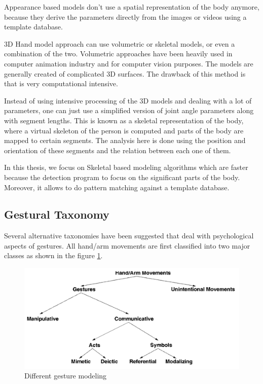 Appearance based models don't use a spatial representation of the body anymore, because they derive the parameters directly from the images or videos using a template database. 

3D Hand model approach can use volumetric or skeletal models, or even a combination of the two. Volumetric approaches have been heavily used in computer animation industry and for computer vision purposes. The models are generally created of complicated 3D surfaces. The drawback of this method is that is very computational intensive. 

Instead of using intensive processing of the 3D models and dealing with a lot of parameters, one can just use a simplified version of joint angle parameters along with segment lengths. This is known as a skeletal representation of the body, where a virtual skeleton of the person is computed and parts of the body are mapped to certain segments. The analysis here is done using the position and orientation of these segments and the relation between each one of them.

In this thesis, we focus on Skeletal based modeling algorithms which are faster because the detection program to focus on the significant parts of the body. Moreover, it allows to do pattern matching against a template database. 


\subsection{Gestural Taxonomy }
Several alternative taxonomies have been suggested that deal with psychological aspects of gestures. All hand/arm movements are first classified into two major classes as shown in the figure \ref{fig:ges:tax}.

\begin{figure}
	[h] \centering 
	\includegraphics[width=13cm]{figures/ges-tax.png} 
	\caption{Different gesture modeling} 
	\label{fig:ges:tax} 
\end{figure}

